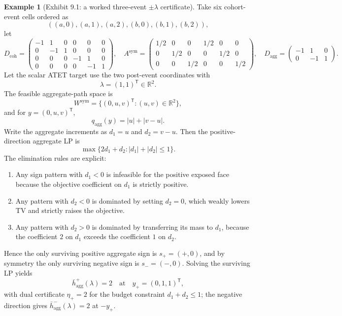 \documentclass[11pt]{article}
\newcommand{\transpose}{\mathsf{T}}
\newcommand{\R}{\mathbb{R}}
\theoremstyle{definition}
\newtheorem{example}{Example}
\theoremstyle{plain}
\theoremstyle{remark}
\begin{document}
\begin{example}[Exhibit 9.1: a worked three-event \(\pm\lambda\) certificate]\label{ex:conservative}
Take six cohort-event cells ordered as
\[
((a,0),(a,1),(a,2),(b,0),(b,1),(b,2)),
\]
let
\[
D_{\mathrm{coh}}=
\begin{pmatrix}
-1&1&0&0&0&0\\
0&-1&1&0&0&0\\
0&0&0&-1&1&0\\
0&0&0&0&-1&1
\end{pmatrix},
\quad
A^{\mathrm{sym}}=
\begin{pmatrix}
1/2&0&0&1/2&0&0\\
0&1/2&0&0&1/2&0\\
0&0&1/2&0&0&1/2
\end{pmatrix},
\quad
D_{\mathrm{agg}}=
\begin{pmatrix}
-1&1&0\\
0&-1&1
\end{pmatrix}.
\]
Let the scalar ATET target use the two post-event coordinates with
\[
\lambda=(1,1)^\transpose\in\R^2.
\]
The feasible aggregate-path space is
\[
W^{\mathrm{sym}}=\{(0,u,v)^\transpose:(u,v)\in\R^2\},
\]
and for \(y=(0,u,v)^\transpose\),
\[
q_{\mathrm{agg}}(y)=|u|+|v-u|.
\]
Write the aggregate increments as \(d_1=u\) and \(d_2=v-u\). Then the positive-direction aggregate LP is
\[
\max\{2d_1+d_2: |d_1|+|d_2|\le 1\}.
\]
The elimination rules are explicit:
\begin{enumerate}[leftmargin=*]
\item Any sign pattern with \(d_1<0\) is infeasible for the positive exposed face because the objective coefficient on \(d_1\) is strictly positive.
\item Any pattern with \(d_2<0\) is dominated by setting \(d_2=0\), which weakly lowers TV and strictly raises the objective.
\item Any pattern with \(d_2>0\) is dominated by transferring its mass to \(d_1\), because the coefficient \(2\) on \(d_1\) exceeds the coefficient \(1\) on \(d_2\).
\end{enumerate}
Hence the only surviving positive aggregate sign is \(s_+=(+,0)\), and by symmetry the only surviving negative sign is \(s_-=(-,0)\). Solving the surviving LP yields
\[
\bar h_{\mathrm{agg}}^+(\lambda)=2
\quad\text{at}\quad
y_+=(0,1,1)^\transpose,
\]
with dual certificate \(\eta_+=2\) for the budget constraint \(d_1+d_2\le 1\); the negative direction gives \(\bar h_{\mathrm{agg}}^-(\lambda)=2\) at \(-y_+\).


\end{example}
\end{document}
